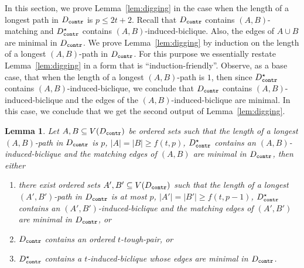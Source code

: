 \documentclass[a4paper,11pt]{article}
\theoremstyle{plain}
\newtheorem{lemma}[theorem]{Lemma}
\newtheorem{identification rule}{Identification Rule}
\theoremstyle{definition}
\theoremstyle{remark}
\newcommand{\toughpair}{tough-pair}
\newcommand{\contr}{\textnormal{\texttt{contr}}}
\newcommand{\Dcontr}{D_{\contr}}
\begin{document}
In this section, we prove Lemma~\ref{lem:digging} in the case when the length of a longest path in $\Dcontr$ is $p \leq 2t+2$. Recall that $\Dcontr$ contains $(A,B)$-matching and $\Dcontr^{\star}$ contains $(A,B)$-induced-biclique. Also, the edges of $A \cup B$ are minimal in $\Dcontr$. We prove Lemma~\ref{lem:digging} by induction on the length of a longest $(A,B)$-path in $\Dcontr$.
For this purpose we essentially restate Lemma~\ref{lem:digging} in a form that is ``induction-friendly''. Observe, as a base case, that when the length of a longest $(A,B)$-path is $1$, then since $\Dcontr^{\star}$ contains $(A,B)$-induced-biclique, we conclude that $\Dcontr$ contains $(A,B)$-induced-biclique and the edges of the $(A,B)$-induced-biclique are minimal. In this case, we conclude that we get the second output of Lemma~\ref{lem:digging}.

\begin{lemma}\label{lem:biclique:nolongpath}
Let $A,B \subseteq V(\Dcontr)$ be ordered sets such that the length
of a longest $(A,B)$-path in $\Dcontr$ is $p$,
$|A|= |B| \geq f(t,p)$, $\Dcontr^{\star}$ contains an $(A,B)$-induced-biclique and the matching edges of $(A,B)$ are minimal in $\Dcontr$, then either
\begin{enumerate}
\item there exist ordered sets $A',B' \subseteq V(\Dcontr)$ such that the length
of a longest $(A',B')$-path in $\Dcontr$ is at most $p$,
$|A'|= |B'| \geq f(t,p-1)$, $\Dcontr^{\star}$ contains an $(A',B')$-induced-biclique and the matching edges of $(A',B')$ are minimal in $\Dcontr$, or
\item $\Dcontr$ contains an ordered $t$-\toughpair, or
\item $\Dcontr^{\star}$ contains a $t$-induced-biclique whose edges are minimal in $\Dcontr$.
\end{enumerate}
\end{lemma}
\end{document}

